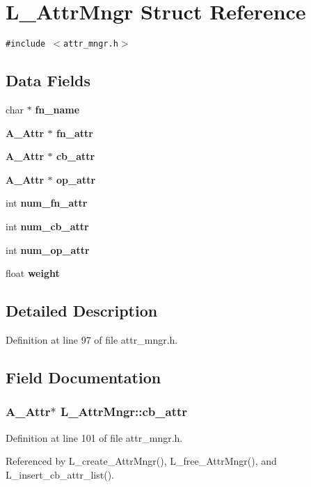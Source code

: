 \section{L\_\-Attr\-Mngr Struct Reference}
\label{structL__AttrMngr}
{\tt \#include $<$attr\_\-mngr.h$>$}

\subsection*{Data Fields}
\begin{CompactItemize}
\item 
char $\ast$ \bf{fn\_\-name}
\item 
\bf{A\_\-Attr} $\ast$ \bf{fn\_\-attr}
\item 
\bf{A\_\-Attr} $\ast$ \bf{cb\_\-attr}
\item 
\bf{A\_\-Attr} $\ast$ \bf{op\_\-attr}
\item 
int \bf{num\_\-fn\_\-attr}
\item 
int \bf{num\_\-cb\_\-attr}
\item 
int \bf{num\_\-op\_\-attr}
\item 
float \bf{weight}
\end{CompactItemize}


\subsection{Detailed Description}




Definition at line 97 of file attr\_\-mngr.h.

\subsection{Field Documentation}
\subsubsection{\setlength{\rightskip}{0pt plus 5cm}\bf{A\_\-Attr}$\ast$ \bf{L\_\-Attr\-Mngr::cb\_\-attr}}\label{structL__AttrMngr_854e8371a1c0bc26d48dedd2cd0166fe}




Definition at line 101 of file attr\_\-mngr.h.

Referenced by L\_\-create\_\-Attr\-Mngr(), L\_\-free\_\-Attr\-Mngr(), and L\_\-insert\_\-cb\_\-attr\_\-list().
